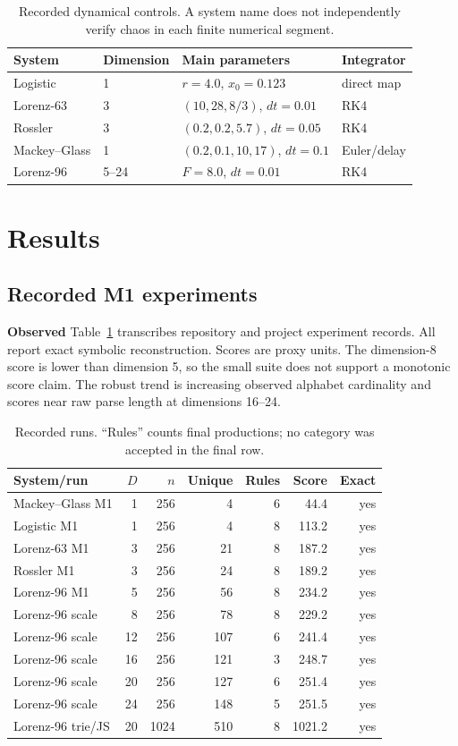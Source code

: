 \documentclass[11pt]{article}
\newcommand{\Observed}{\textbf{Observed}}
\begin{document}
\begin{table}[ht]
\centering\small
\begin{tabular}{llll}
\toprule
System & Dimension & Main parameters & Integrator \\
\midrule
Logistic & 1 & $r=4.0$, $x_0=0.123$ & direct map \\
Lorenz-63 & 3 & $(10,28,8/3)$, $dt=0.01$ & RK4 \\
Rossler & 3 & $(0.2,0.2,5.7)$, $dt=0.05$ & RK4 \\
Mackey--Glass & 1 & $(0.2,0.1,10,17)$, $dt=0.1$ & Euler/delay \\
Lorenz-96 & 5--24 & $F=8.0$, $dt=0.01$ & RK4 \\
\bottomrule
\end{tabular}
\caption{Recorded dynamical controls. A system name does not independently verify chaos in each finite numerical segment.}
\end{table}

\section{Results}
\subsection{Recorded M1 experiments}
\Observed{} Table~\ref{tab:runs} transcribes repository and project experiment records. All report exact symbolic reconstruction. Scores are proxy units. The dimension-8 score is lower than dimension 5, so the small suite does not support a monotonic score claim. The robust trend is increasing observed alphabet cardinality and scores near raw parse length at dimensions 16--24.

\begin{table}[ht]
\centering\small
\begin{tabular}{lrrrrrr}
\toprule
System/run & $D$ & $n$ & Unique & Rules & Score & Exact \\
\midrule
Mackey--Glass M1 & 1 & 256 & 4 & 6 & 44.4 & yes \\
Logistic M1 & 1 & 256 & 4 & 8 & 113.2 & yes \\
Lorenz-63 M1 & 3 & 256 & 21 & 8 & 187.2 & yes \\
Rossler M1 & 3 & 256 & 24 & 8 & 189.2 & yes \\
Lorenz-96 M1 & 5 & 256 & 56 & 8 & 234.2 & yes \\
Lorenz-96 scale & 8 & 256 & 78 & 8 & 229.2 & yes \\
Lorenz-96 scale & 12 & 256 & 107 & 6 & 241.4 & yes \\
Lorenz-96 scale & 16 & 256 & 121 & 3 & 248.7 & yes \\
Lorenz-96 scale & 20 & 256 & 127 & 6 & 251.4 & yes \\
Lorenz-96 scale & 24 & 256 & 148 & 5 & 251.5 & yes \\
Lorenz-96 trie/JS & 20 & 1024 & 510 & 8 & 1021.2 & yes \\
\bottomrule
\end{tabular}
\caption{Recorded runs. ``Rules'' counts final productions; no category was accepted in the final row.}
\label{tab:runs}
\end{table}
\end{document}
